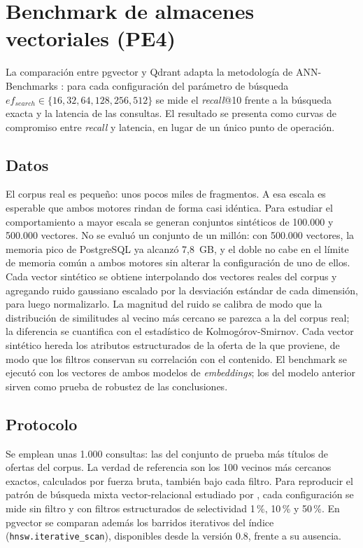 \section{Benchmark de almacenes vectoriales (PE4)}
\label{sec:met-benchmark}

La comparación entre pgvector y Qdrant adapta la metodología de ANN-Benchmarks \citep{Aumuller2020}: para cada configuración del parámetro de búsqueda $ef_{search} \in \{16, 32, 64, 128, 256, 512\}$ se mide el \textit{recall}@10 frente a la búsqueda exacta y la latencia de las consultas. El resultado se presenta como curvas de compromiso entre \textit{recall} y latencia, en lugar de un único punto de operación.

\subsection{Datos}

El corpus real es pequeño: unos pocos miles de fragmentos. A esa escala es esperable que ambos motores rindan de forma casi idéntica. Para estudiar el comportamiento a mayor escala se generan conjuntos sintéticos de 100.000 y 500.000 vectores. No se evaluó un conjunto de un millón: con 500.000 vectores, la memoria pico de PostgreSQL ya alcanzó 7,8~GB, y el doble no cabe en el límite de memoria común a ambos motores sin alterar la configuración de uno de ellos. Cada vector sintético se obtiene interpolando dos vectores reales del corpus y agregando ruido gaussiano escalado por la desviación estándar de cada dimensión, para luego normalizarlo. La magnitud del ruido se calibra de modo que la distribución de similitudes al vecino más cercano se parezca a la del corpus real; la diferencia se cuantifica con el estadístico de Kolmogórov-Smirnov. Cada vector sintético hereda los atributos estructurados de la oferta de la que proviene, de modo que los filtros conservan su correlación con el contenido. El benchmark se ejecutó con los vectores de ambos modelos de \textit{embeddings}; los del modelo anterior sirven como prueba de robustez de las conclusiones.

\subsection{Protocolo}

Se emplean unas 1.000 consultas: las del conjunto de prueba más títulos de ofertas del corpus. La verdad de referencia son los 100 vecinos más cercanos exactos, calculados por fuerza bruta, también bajo cada filtro. Para reproducir el patrón de búsqueda mixta vector-relacional estudiado por \citet{Sanca2024}, cada configuración se mide sin filtro y con filtros estructurados de selectividad 1\,\%, 10\,\% y 50\,\%. En pgvector se comparan además los barridos iterativos del índice (\texttt{hnsw.\allowbreak iterative\_scan}), disponibles desde la versión 0.8, frente a su ausencia.

